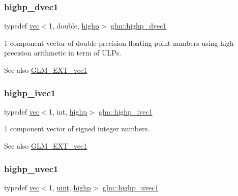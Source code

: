 \subsubsection{\texorpdfstring{highp\+\_\+dvec1}{highp\_dvec1}}
{\footnotesize\ttfamily typedef \hyperlink{structglm_1_1vec}{vec}$<$1, double, \hyperlink{namespaceglm_a36ed105b07c7746804d7fdc7cc90ff25ac6f7eab42eacbb10d59a58e95e362074}{highp}$>$ \hyperlink{group__ext__vec1_ga51e54e6b2fe3962fc44a176eeb3e3fe6}{glm\+::highp\+\_\+dvec1}}

1 component vector of double-\/precision floating-\/point numbers using high precision arithmetic in term of U\+L\+Ps.

\begin{DoxySeeAlso}{See also}
\hyperlink{group__ext__vec1}{G\+L\+M\+\_\+\+E\+X\+T\+\_\+vec1} 
\end{DoxySeeAlso}
\mbox{\label{group__ext__vec1_gac44dcd92c25ab0d3f5c514137d5460d8}} 
\subsubsection{\texorpdfstring{highp\+\_\+ivec1}{highp\_ivec1}}
{\footnotesize\ttfamily typedef \hyperlink{structglm_1_1vec}{vec}$<$1, int, \hyperlink{namespaceglm_a36ed105b07c7746804d7fdc7cc90ff25ac6f7eab42eacbb10d59a58e95e362074}{highp}$>$ \hyperlink{group__ext__vec1_gac44dcd92c25ab0d3f5c514137d5460d8}{glm\+::highp\+\_\+ivec1}}

1 component vector of signed integer numbers.

\begin{DoxySeeAlso}{See also}
\hyperlink{group__ext__vec1}{G\+L\+M\+\_\+\+E\+X\+T\+\_\+vec1} 
\end{DoxySeeAlso}
\mbox{\label{group__ext__vec1_ga4e92a1105fa908e8a96971602381e381}} 
\subsubsection{\texorpdfstring{highp\+\_\+uvec1}{highp\_uvec1}}
{\footnotesize\ttfamily typedef \hyperlink{structglm_1_1vec}{vec}$<$1, \hyperlink{group__core__precision_ga4fd29415871152bfb5abd588334147c8}{uint}, \hyperlink{namespaceglm_a36ed105b07c7746804d7fdc7cc90ff25ac6f7eab42eacbb10d59a58e95e362074}{highp}$>$ \hyperlink{group__ext__vec1_ga4e92a1105fa908e8a96971602381e381}{glm\+::highp\+\_\+uvec1}}


